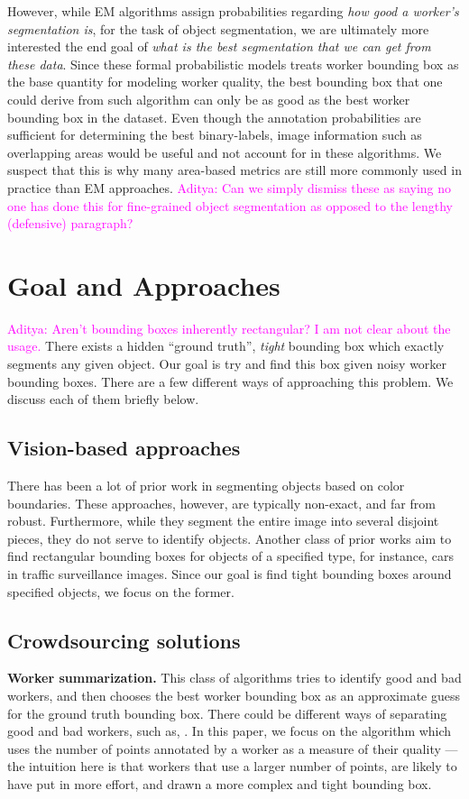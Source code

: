 \documentclass[letterpaper]{article} %
\newcommand{\agp}[1]{\textcolor{magenta}{Aditya: #1}}
\begin{document}
\par However, while EM algorithms assign probabilities regarding  \textit{how good a worker's segmentation is}, for the task of object segmentation, we are ultimately more interested the end goal of \textit{what is the best segmentation that we can get from these data}. 
Since these formal probabilistic models treats worker bounding box as the base quantity for modeling worker quality, the best bounding box that one could derive from such algorithm can only be as good as the best worker bounding box in the dataset.  Even though the annotation probabilities are sufficient for determining the best binary-labels, image information such as overlapping areas would be useful and not account for in these algorithms. We suspect that this is why many area-based metrics are still more commonly used in practice than EM approaches.
\agp{Can we simply dismiss these as saying no one has done this for fine-grained object segmentation
as opposed to the lengthy (defensive) paragraph?}

\section{Goal and Approaches}
\agp{Aren't bounding boxes inherently rectangular? I am not clear about the usage.}
There exists a hidden ``ground truth'', {\em tight} bounding box which exactly segments any given object. Our goal is try and find this box given noisy worker bounding boxes. There are a few different ways of approaching this problem. We discuss each of them briefly below.

\subsection{Vision-based approaches}
There has been a lot of prior work in segmenting objects based on color boundaries. These approaches, however, are typically non-exact, and far from robust. Furthermore, while they segment the entire image into several disjoint pieces, they do not serve to identify objects. Another class of prior works aim to find rectangular bounding boxes for objects of a specified type, for instance, cars in traffic surveillance images. Since our goal is find tight bounding boxes around specified objects, we focus on the former.

\subsection{Crowdsourcing solutions}
\smallskip
\noindent
{\bf Worker summarization.}
This class of algorithms tries to identify good and bad workers, and then chooses the best worker bounding box as an approximate guess for the ground truth bounding box. There could be different ways of separating good and bad workers, such as, . In this paper, we focus on the algorithm which uses the number of points annotated by a worker as a measure of their quality --- the intuition here is that workers that use a larger number of points, are likely to have put in more effort, and drawn a more complex and tight bounding box.
\end{document}

